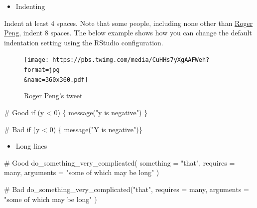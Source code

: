 \documentclass[
  letterpaper,
  DIV=11,
  numbers=noendperiod]{scrreprt}
\newenvironment{Shaded}{\begin{snugshade}}{\end{snugshade}}
\newcommand{\AttributeTok}[1]{\textcolor[rgb]{0.40,0.45,0.13}{#1}}
\newcommand{\CommentTok}[1]{\textcolor[rgb]{0.37,0.37,0.37}{#1}}
\newcommand{\ControlFlowTok}[1]{\textcolor[rgb]{0.00,0.23,0.31}{#1}}
\newcommand{\DecValTok}[1]{\textcolor[rgb]{0.68,0.00,0.00}{#1}}
\newcommand{\FunctionTok}[1]{\textcolor[rgb]{0.28,0.35,0.67}{#1}}
\newcommand{\NormalTok}[1]{\textcolor[rgb]{0.00,0.23,0.31}{#1}}
\newcommand{\SpecialCharTok}[1]{\textcolor[rgb]{0.37,0.37,0.37}{#1}}
\newcommand{\StringTok}[1]{\textcolor[rgb]{0.13,0.47,0.30}{#1}}
\providecommand{\tightlist}{%
  \setlength{\itemsep}{0pt}\setlength{\parskip}{0pt}}\usepackage{longtable,booktabs,array}
\begin{document}
\begin{itemize}
\tightlist
\item
  Indenting
\end{itemize}

Indent at least 4 spaces. Note that some people, including none other
than
\href{https://simplystatistics.org/2018/07/27/why-i-indent-my-code-8-spaces/}{Roger
Peng}, indent 8 spaces. The below example shows how you can change the
default indentation setting using the RStudio configuration.

\begin{figure}

{\centering \texttt{[image: https://pbs.twimg.com/media/CuHHs7yXgAAFWeh?format=jpg\\\&name=360x360.pdf]}

}

\caption{Roger Peng's tweet}

\end{figure}

\begin{Shaded}
\begin{Highlighting}[]
\CommentTok{\# Good}
\ControlFlowTok{if}\NormalTok{ (y }\SpecialCharTok{\textless{}} \DecValTok{0}\NormalTok{) \{}
  \FunctionTok{message}\NormalTok{(}\StringTok{"y is negative"}\NormalTok{)}
\NormalTok{\}}

\CommentTok{\# Bad}
\ControlFlowTok{if}\NormalTok{ (y }\SpecialCharTok{\textless{}} \DecValTok{0}\NormalTok{) \{}
\FunctionTok{message}\NormalTok{(}\StringTok{"Y is negative"}\NormalTok{)\}}
\end{Highlighting}
\end{Shaded}

\begin{itemize}
\tightlist
\item
  Long lines
\end{itemize}

\begin{Shaded}
\begin{Highlighting}[]
\CommentTok{\# Good}
\FunctionTok{do\_something\_very\_complicated}\NormalTok{(}
  \AttributeTok{something =} \StringTok{"that"}\NormalTok{,}
  \AttributeTok{requires =}\NormalTok{ many,}
  \AttributeTok{arguments =} \StringTok{"some of which may be long"}
\NormalTok{)}

\CommentTok{\# Bad}
\FunctionTok{do\_something\_very\_complicated}\NormalTok{(}\StringTok{"that"}\NormalTok{, }\AttributeTok{requires =}\NormalTok{ many, }\AttributeTok{arguments =}
                              \StringTok{"some of which may be long"}
\NormalTok{                              )}
\end{Highlighting}
\end{Shaded}
\end{document}
